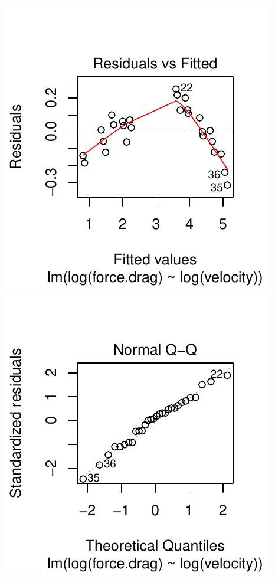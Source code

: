 \documentclass[twoside]{book}\usepackage[]{graphicx}\usepackage[]{xcolor}
\makeatletter
\def\maxwidth{ %
  \ifdim\Gin@nat@width>\linewidth
    \linewidth
  \else
    \Gin@nat@width
  \fi
}
\newenvironment{knitrout}{}{} %
\makeatother
\begin{document}
\begin{solution}
\begin{knitrout}
{\centering \includegraphics[width=\maxwidth]{figures/fig-unnamed-chunk-269-1} 
\includegraphics[width=\maxwidth]{figures/fig-unnamed-chunk-269-2} 

}




\end{knitrout}
\end{solution}
\end{document}
